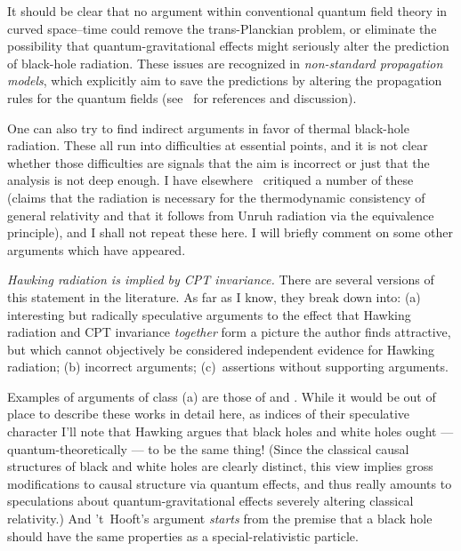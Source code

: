 \documentclass[
%
draft    %
,numberedheadings 
,bibliocites
  ]
  {aipproc}
\begin{document}
It should be clear that no argument within conventional quantum field theory in curved space--time could remove the trans-Planckian problem, or eliminate the possibility that quantum-gravitational effects might seriously alter the prediction of black-hole radiation.  These issues are recognized in {\em non-standard propagation models}, which explicitly aim to save the predictions by altering the propagation rules for the quantum fields (see~\citep{Helfer:2003va} for references and discussion).

One can also try to find indirect arguments in favor of thermal black-hole radiation.  These all run into difficulties at essential points, and it is not clear whether those difficulties are signals that the aim is incorrect or just that the analysis is not deep enough.
I have elsewhere~\citep{Helfer:2003va} critiqued a number of these (claims that the radiation is necessary for the thermodynamic consistency of general relativity and that it follows from Unruh radiation via the equivalence principle), and I shall not repeat these here.  I will briefly comment on some other arguments which have appeared.


{\em Hawking radiation is implied by CPT invariance.}  
There are several versions of this statement in the literature.  As far as I know, they break down into:  (a) interesting but radically speculative arguments to the effect that Hawking radiation and CPT invariance {\em together} form a picture the author finds attractive, but which cannot objectively be considered independent evidence for Hawking radiation; (b) incorrect arguments; (c)~assertions without supporting arguments.  

Examples of arguments of class (a) are those of \citet{Hawking:1976de} and \citet{Hooft:1996tq}.  
While it would be out of place to describe these works in detail here, as indices of their speculative character I'll note that Hawking argues that black holes and white holes ought --- quantum-theoretically --- to be the same thing!  (Since the classical causal structures of black and white holes are clearly distinct, this view implies gross modifications to causal structure via quantum effects, and thus really amounts to speculations about quantum-gravitational effects severely altering classical relativity.)  And 't~Hooft's argument {\em starts} from the premise that a black hole should have the same properties as a special-relativistic particle.
\end{document}
